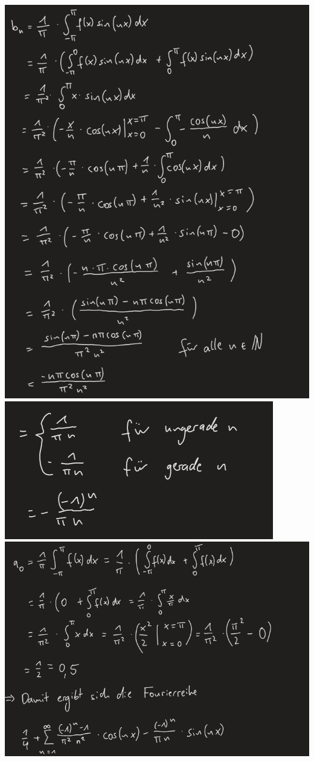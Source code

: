 \documentclass{article}
\begin{document}
\includegraphics[scale=0.5]{ 4 } \\ 
\includegraphics[scale=0.5]{ 5 } \\ 
\includegraphics[scale=0.5]{ 6 } \\ 
\end{document}
